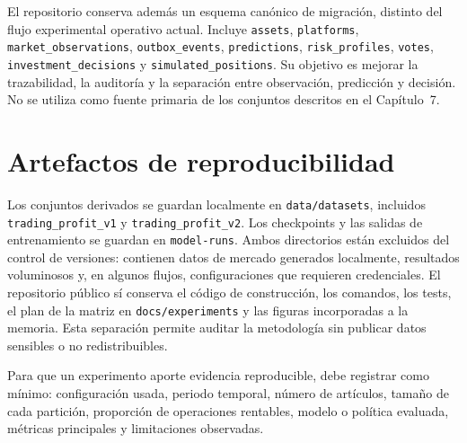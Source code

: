 El repositorio conserva además un esquema canónico de migración, distinto del flujo experimental operativo actual. Incluye \texttt{assets}, \texttt{platforms}, \texttt{market\_observations}, \texttt{outbox\_events}, \texttt{predictions}, \texttt{risk\_profiles}, \texttt{votes}, \texttt{investment\_decisions} y \texttt{simulated\_positions}. Su objetivo es mejorar la trazabilidad, la auditoría y la separación entre observación, predicción y decisión. No se utiliza como fuente primaria de los conjuntos descritos en el Capítulo~7.

\section{Artefactos de reproducibilidad}

Los conjuntos derivados se guardan localmente en \texttt{data/datasets}, incluidos \texttt{trading\_profit\_v1} y \texttt{trading\_profit\_v2}. Los checkpoints y las salidas de entrenamiento se guardan en \texttt{model-runs}. Ambos directorios están excluidos del control de versiones: contienen datos de mercado generados localmente, resultados voluminosos y, en algunos flujos, configuraciones que requieren credenciales. El repositorio público sí conserva el código de construcción, los comandos, los tests, el plan de la matriz  en \texttt{docs/experiments} y las figuras incorporadas a la memoria. Esta separación permite auditar la metodología sin publicar datos sensibles o no redistribuibles.

Para que un experimento aporte evidencia reproducible, debe registrar como mínimo: configuración usada, periodo temporal, número de artículos, tamaño de cada partición, proporción de operaciones rentables, modelo o política evaluada, métricas principales y limitaciones observadas.
